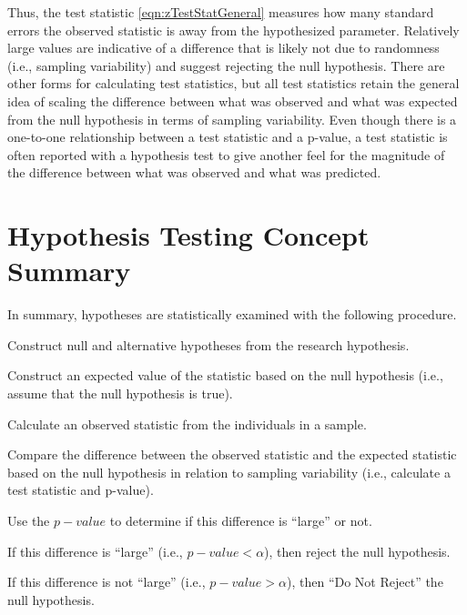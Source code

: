 \documentclass[10pt,openany]{book}\usepackage[]{graphicx}\usepackage[]{color}
\begin{document}
Thus, the test statistic \eqref{eqn:zTestStatGeneral} measures how many standard errors the observed statistic is away from the hypothesized parameter.  Relatively large values are indicative of a difference that is likely not due to randomness (i.e., sampling variability) and suggest rejecting the null hypothesis.  There are other forms for calculating test statistics, but all test statistics retain the general idea of scaling the difference between what was observed and what was expected from the null hypothesis in terms of sampling variability.  Even though there is a one-to-one relationship between a test statistic and a p-value, a test statistic is often reported with a hypothesis test to give another feel for the magnitude of the difference between what was observed and what was predicted.



\section{Hypothesis Testing Concept Summary}
\vspace{-12pt}
In summary, hypotheses are statistically examined with the following procedure.
\begin{Enumerate}
  \item Construct null and alternative hypotheses from the research hypothesis.
  \item Construct an expected value of the statistic based on the null hypothesis (i.e., assume that the null hypothesis is true).
  \item Calculate an observed statistic from the individuals in a sample.
  \item Compare the difference between the observed statistic and the expected statistic based on the null hypothesis in relation to sampling variability (i.e., calculate a test statistic and p-value).
  \item Use the $p-value$ to determine if this difference is ``large'' or not.
  \begin{Itemize}
    \item If this difference is ``large'' (i.e., $p-value<\alpha$), then reject the null hypothesis.
    \item If this difference is not ``large'' (i.e., $p-value>\alpha$), then ``Do Not Reject'' the null hypothesis.
  \end{Itemize}
\end{Enumerate}
\end{document}
